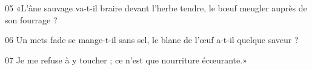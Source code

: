 
05 «L’âne sauvage va-t-il braire devant l’herbe tendre, le bœuf meugler auprès de son fourrage ?

06 Un mets fade se mange-t-il sans sel, le blanc de l’œuf a-t-il quelque saveur ?

07 Je me refuse à y toucher ; ce n’est que nourriture écœurante.»
